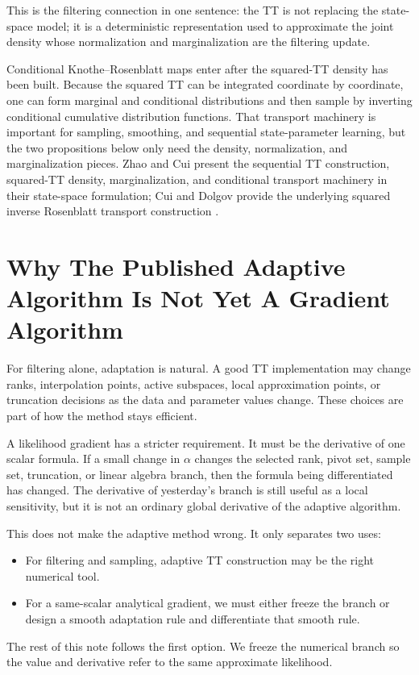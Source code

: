 \documentclass[11pt]{article}
\theoremstyle{definition}
\theoremstyle{remark}
\begin{document}
This is the filtering connection in one sentence: the TT is not replacing the
state-space model; it is a deterministic representation used to approximate
the joint density whose normalization and marginalization are the filtering
update.

Conditional Knothe--Rosenblatt maps enter after the squared-TT density has
been built.  Because the squared TT can be integrated coordinate by coordinate,
one can form marginal and conditional distributions and then sample by
inverting conditional cumulative distribution functions.  That transport
machinery is important for sampling, smoothing, and sequential state-parameter
learning, but the two propositions below only need the density,
normalization, and marginalization pieces.  Zhao and Cui present the sequential
TT construction, squared-TT density, marginalization, and conditional transport
machinery in their state-space formulation; Cui and Dolgov provide the
underlying squared inverse Rosenblatt transport construction
\cite{zhao-cui-2024,cui-dolgov-2022}.

\section{Why The Published Adaptive Algorithm Is Not Yet A Gradient Algorithm}

For filtering alone, adaptation is natural.  A good TT implementation may
change ranks, interpolation points, active subspaces, local approximation
points, or truncation decisions as the data and parameter values change.  These
choices are part of how the method stays efficient.

A likelihood gradient has a stricter requirement.  It must be the derivative
of one scalar formula.  If a small change in \(\alpha\) changes the selected
rank, pivot set, sample set, truncation, or linear algebra branch, then the
formula being differentiated has changed.  The derivative of yesterday's
branch is still useful as a local sensitivity, but it is not an ordinary global
derivative of the adaptive algorithm.

This does not make the adaptive method wrong.  It only separates two uses:
\begin{itemize}[leftmargin=*]
\item For filtering and sampling, adaptive TT construction may be the right
  numerical tool.
\item For a same-scalar analytical gradient, we must either freeze the branch
  or design a smooth adaptation rule and differentiate that smooth rule.
\end{itemize}
The rest of this note follows the first option.  We freeze the numerical
branch so the value and derivative refer to the same approximate likelihood.
\end{document}
